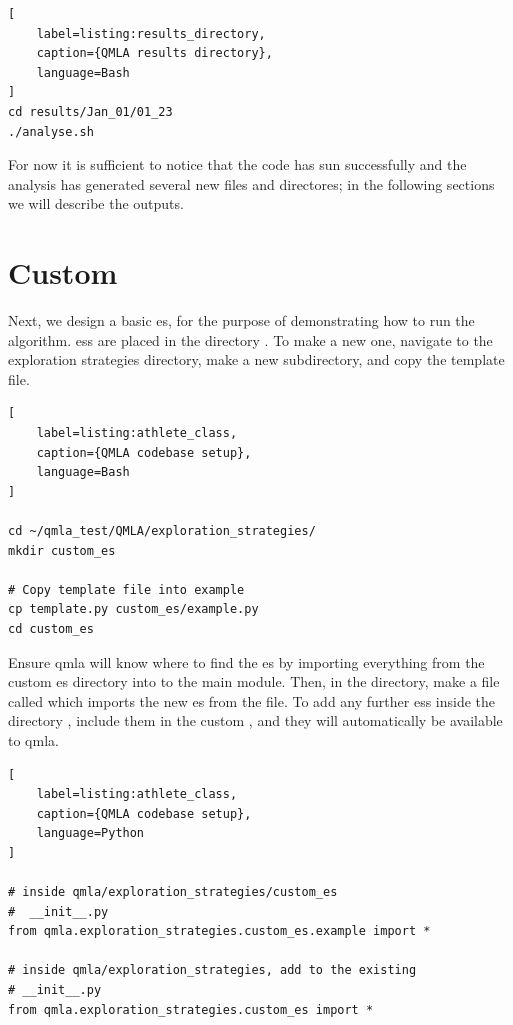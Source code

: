 \begin{lstlisting}[
    label=listing:results_directory,
    caption={QMLA results directory},
    language=Bash
]
cd results/Jan_01/01_23
./analyse.sh
\end{lstlisting}

For now it is sufficient to notice that the code has sun successfully and the analysis has generated several new files and directores; 
    in the following sections we will describe the outputs. 

\section{Custom }

Next, we design a basic \gls{es}, for the purpose of demonstrating how to run the algorithm.
\glspl{es} are placed in the directory . 
To make a new one, navigate to the exploration strategies directory, 
make a new subdirectory, and copy the template file. 

\begin{lstlisting}[
    label=listing:athlete_class,
    caption={QMLA codebase setup},
    language=Bash
]

cd ~/qmla_test/QMLA/exploration_strategies/
mkdir custom_es

# Copy template file into example
cp template.py custom_es/example.py
cd custom_es

\end{lstlisting}

Ensure \gls{qmla} will know where to find the \gls{es} by importing everything from the custom \gls{es} 
    directory into to the main  module. 
Then, in the  directory, make a file called  which imports the new \gls{es}
    from the  file. 
To add any further \glspl{es} inside the directory , include them in the custom ,
    and they will automatically be available to \gls{qmla}.

\begin{lstlisting}[
    label=listing:athlete_class,
    caption={QMLA codebase setup},
    language=Python
]

# inside qmla/exploration_strategies/custom_es
#  __init__.py    
from qmla.exploration_strategies.custom_es.example import *

# inside qmla/exploration_strategies, add to the existing
# __init__.py 
from qmla.exploration_strategies.custom_es import *

\end{lstlisting}

